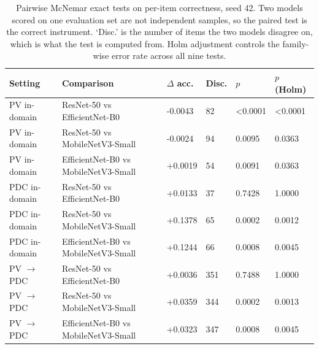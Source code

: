 \begin{table}[htbp]
\caption{Pairwise McNemar exact tests on per-item correctness, seed 42. Two models scored on one evaluation set are not independent samples, so the paired test is the correct instrument. `Disc.' is the number of items the two models disagree on, which is what the test is computed from. Holm adjustment controls the family-wise error rate across all nine tests.}
\label{tab:mcnemar-compact}
\scriptsize
\centering
\setlength{\tabcolsep}{4pt}
\begin{tabular}{llllll}
\toprule
Setting & Comparison & $\Delta$ acc. & Disc. & $p$ & $p$ (Holm) \\
\midrule
PV in-domain & ResNet-50 vs EfficientNet-B0 & -0.0043 & 82 & <0.0001 & <0.0001 \\
PV in-domain & ResNet-50 vs MobileNetV3-Small & -0.0024 & 94 & 0.0095 & 0.0363 \\
PV in-domain & EfficientNet-B0 vs MobileNetV3-Small & +0.0019 & 54 & 0.0091 & 0.0363 \\
PDC in-domain & ResNet-50 vs EfficientNet-B0 & +0.0133 & 37 & 0.7428 & 1.0000 \\
PDC in-domain & ResNet-50 vs MobileNetV3-Small & +0.1378 & 65 & 0.0002 & 0.0012 \\
PDC in-domain & EfficientNet-B0 vs MobileNetV3-Small & +0.1244 & 66 & 0.0008 & 0.0045 \\
PV $\rightarrow$ PDC & ResNet-50 vs EfficientNet-B0 & +0.0036 & 351 & 0.7488 & 1.0000 \\
PV $\rightarrow$ PDC & ResNet-50 vs MobileNetV3-Small & +0.0359 & 344 & 0.0002 & 0.0013 \\
PV $\rightarrow$ PDC & EfficientNet-B0 vs MobileNetV3-Small & +0.0323 & 347 & 0.0008 & 0.0045 \\
\bottomrule
\end{tabular}
\end{table}
